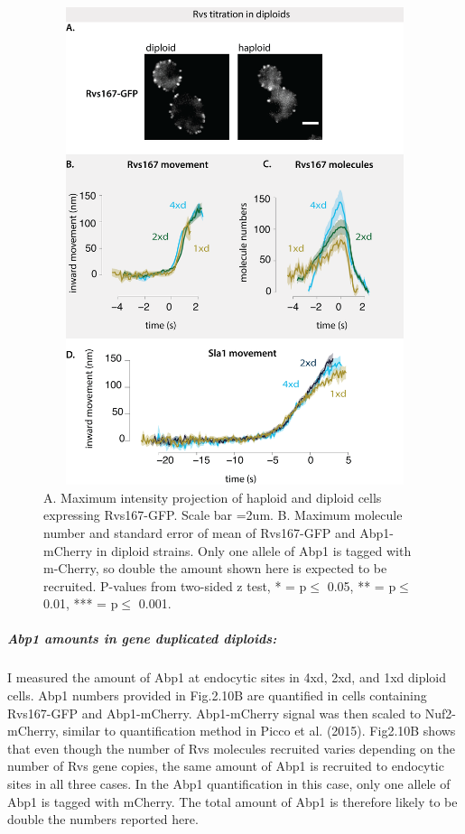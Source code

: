 \vspace{2mm}
						\begin{figure}[H]
	\centering
\includegraphics[width=14cm,height=14cm,keepaspectratio]{figures/results_final/protein_friction7}
	\vspace*{2mm}
	\caption[Molecule numbers in diploid cells]
	{A. Maximum intensity projection of haploid and diploid cells expressing Rvs167-GFP. Scale bar =2um.      
		B. Maximum molecule number and standard error of mean of Rvs167-GFP and Abp1-mCherry in diploid strains. Only one allele of Abp1 is tagged with m-Cherry, so double the amount shown here is expected to be recruited. P-values from two-sided z test,  * = p$\leq$ 0.05, ** = p$\leq$ 0.01, *** = p$\leq$ 0.001. 
		\label{fig_rvsdiploid1}}
\end{figure}








		\subparagraph{Abp1 amounts in gene duplicated diploids:}
		
I measured the amount of Abp1 at endocytic sites in 4xd, 2xd, and 1xd diploid cells. Abp1 numbers provided in Fig.2.10B are quantified in cells containing Rvs167-GFP and Abp1-mCherry.  Abp1-mCherry signal was then scaled to Nuf2-mCherry, similar to quantification method in Picco et al. (2015). Fig2.10B shows that even though the number of Rvs molecules recruited varies depending on the number of Rvs gene copies, the same amount of Abp1 is recruited to endocytic sites in all three cases. In the Abp1 quantification in this case, only one allele of Abp1 is tagged with mCherry. The total amount of Abp1 is therefore likely to be double the numbers reported here. 

